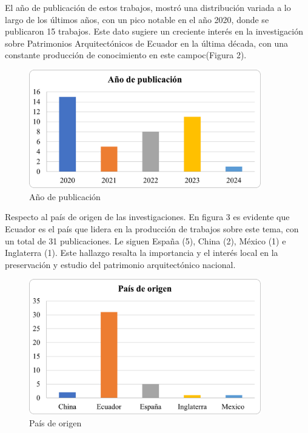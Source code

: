 \documentclass[journal,article,submit,pdftex,moreauthors]{Definitions/mdpi}
\begin{document}
\par %
El año de publicación de estos trabajos, mostró una distribución variada a lo largo de los últimos años, con un pico notable en el año 2020, donde se publicaron 15 trabajos. Este dato sugiere un creciente interés en la investigación sobre Patrimonios Arquitectónicos de Ecuador en la última década, con una constante producción de conocimiento en este campoc(Figura 2). \par %
\begin{figure} [h!]
  \centering
  \includegraphics[width=0.9\textwidth]{Graficos/año de publicación.png}
    \caption{Año de publicación}
  \label{fig:grafico}
\end{figure}  
\par %
Respecto al país de origen de las investigaciones. En figura 3 es evidente que Ecuador es el país que lidera en la producción de trabajos sobre este tema, con un total de 31 publicaciones. Le siguen España (5), China (2), México (1) e Inglaterra (1). Este hallazgo resalta la importancia y el interés local en la preservación y estudio del patrimonio arquitectónico nacional.
\newpage
\par %
  \begin{figure} [h!]
    \centering
    \includegraphics[width=0.9\textwidth]{Graficos/Pais de origen.png }
    \caption{País de origen}
    \label{fig:grafico}
\end{figure}
\par %
 
\end{document}

